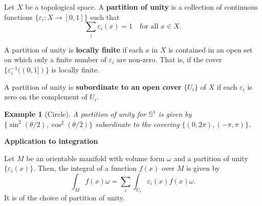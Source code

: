 \documentclass[12pt]{article}
\newcommand*{\Sset}{\mathbb{S}}
\theoremstyle{inlinedefn}
\theoremstyle{break}
\newtheorem{example}{Example}
\newcommand*{\defn}[1]{\textbf{#1}}
\begin{document}
Let $X$ be a topological space.
A \defn{partition of unity} is a collection of continuous functions $\{\varepsilon_i \colon X \to [0,1]\}$ such that
\begin{equation}
\sum_i \varepsilon_i(x) = 1 \quad\mbox{for all $x \in X$}.
\end{equation}

A partition of unity is \defn{locally finite} if each $x$ in $X$ is contained in an open set on which only a finite number of $\varepsilon_i$ are non-zero.
That is, if the cover $\{\varepsilon_i^{-1}((0,1])\}$ is locally finite.

A partition of unity is \defn{subordinate to an open cover} $\{U_i\}$ of $X$ if each $\varepsilon_i$ is zero on the complement of $U_i$.

\begin{example}[Circle]
A partition of unity for $\Sset^1$ is given by
$\{ \sin^2(\theta/2), \cos^2(\theta/2) \}$
subordinate to the covering
$\{ (0, 2\pi), (-\pi, \pi) \}$.
\end{example}

\textbf{Application to integration}

Let $M$ be an orientable manifold with volume form $\omega$
and a partition of unity $\{\varepsilon_i(x)\}$.
Then, the integral of a function $f(x)$ over $M$ is given by
\[
\int_M f(x) \omega = \sum_i \int_{U_i} \varepsilon_i(x) f(x) \omega.
\]
It is  of the choice of partition of unity.
\end{document}
